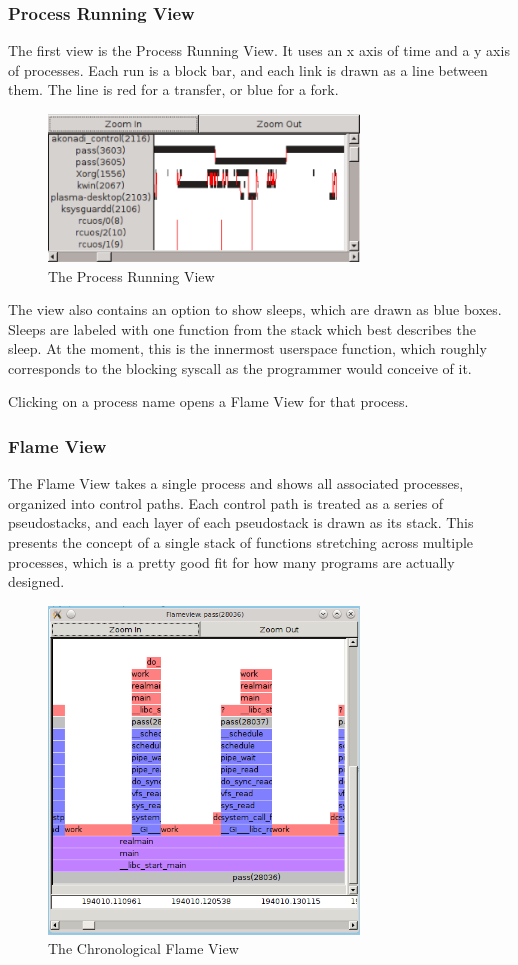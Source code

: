 \documentclass[10pt]{article}
\begin{document}
\subsubsection{Process Running View}

The first view is the Process Running View.  It uses an x axis of time and a y axis of processes.  Each run is a block bar, and each link is drawn as a line between them.  The line is red for a transfer, or blue for a fork.

\begin{figure}[h]
\includegraphics[width=3.25in]{screenshot}
\caption{The Process Running View}
\end{figure}

The view also contains an option to show sleeps, which are drawn as blue boxes.  Sleeps are labeled with one function from the stack which best describes the sleep.  At the moment, this is the innermost userspace function, which roughly corresponds to the blocking syscall as the programmer would conceive of it.

Clicking on a process name opens a Flame View for that process.

\subsubsection{Flame View}

The Flame View takes a single process and shows all associated processes, organized into control paths.  Each control path is treated as a series of pseudostacks, and each layer of each pseudostack is drawn as its stack.  This presents the concept of a single stack of functions stretching across multiple processes, which is a pretty good fit for how many programs are actually designed.

\begin{figure}[h]
\includegraphics[width=3.25in]{flameshot}
\caption{The Chronological Flame View}
\end{figure}
\end{document}

